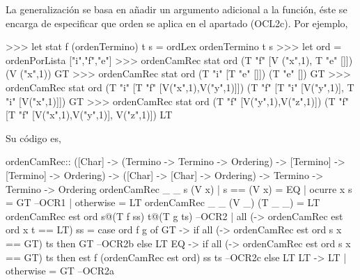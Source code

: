 La generalización se basa en añadir un argumento adicional a la
función, éste se encarga de especificar que orden se aplica en el
apartado (OCL2c). Por ejemplo, 

\begin{sesion}
>>> let stat f (ordenTermino) t s = ordLex ordenTermino t s 
>>> let ord = ordenPorLista ["i","f","e"]
>>> ordenCamRec stat ord (T "f" [V ("x",1), T "e" []]) (V ("x",1))
GT
>>> ordenCamRec stat ord (T "i" [T "e" []]) (T "e" [])
GT
>>> ordenCamRec stat ord (T "i" [T "f" [V("x",1),V("y",1)]])
                           (T "f" [T "i" [V("y",1)], T "i" [V("x",1)]])
GT
>>> ordenCamRec stat ord (T "f" [V("y",1),V("z",1)])
                           (T "f" [T "f" [V("x",1),V("y",1)], V("z",1)])
LT
\end{sesion}

Su código es,

\begin{codigo}
ordenCamRec:: ([Char] -> (Termino -> Termino -> Ordering)
                      -> [Termino] -> [Termino] -> Ordering)
           ->  ([Char] -> [Char] -> Ordering)
           -> Termino
           -> Termino
           -> Ordering
ordenCamRec _ _ s (V x)
  | s == (V x) = EQ
  | ocurre x s = GT --OCR1
  | otherwise = LT
ordenCamRec _ _ (V _) (T _ _) = LT
ordenCamRec est ord s@(T f ss) t@(T g ts) --OCR2
  | all (\x -> ordenCamRec est ord x t == LT) ss
    = case ord f g of
      GT -> if all (\x -> ordenCamRec est ord s x == GT) ts
            then GT --OCR2b
            else LT
      EQ -> if all (\x -> ordenCamRec est ord s x == GT) ts
            then est f (ordenCamRec est ord) ss ts --OCR2c
            else LT
      LT -> LT
  | otherwise = GT --OCR2a
\end{codigo}

